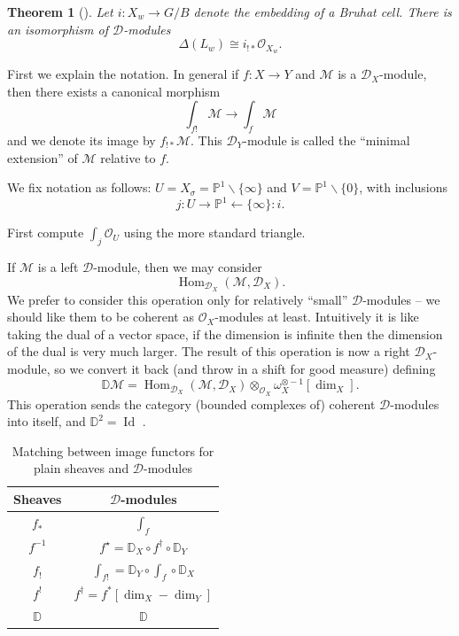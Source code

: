 \documentclass[12pt]{article}
\theoremstyle{plain}
\newtheorem{thm}{Theorem}[section]
\theoremstyle{definition}
\numberwithin{equation}{section}
\DeclareMathOperator{\Hom}{Hom}
\DeclareMathOperator{\Id}{Id}
\newcommand{\bbD}{\mathbb{D}}
\newcommand{\D}{\Delta}
\newcommand{\bbP}{\mathbb{P}}
\newcommand{\CD}{\mathcal{D}}
\newcommand{\OO}{\mathcal{O}}
\newcommand{\CM}{\mathcal{M}}
\begin{document}
\begin{thm}[{\cite[Proposition 12.3.2 (i)]{HTT}}]
Let $i : X_w \rightarrow G/B$ denote the embedding of a Bruhat cell. There is an isomorphism of $\CD$-modules
\[
\D(L_w) \cong i_{!*} \OO_{X_w}.
\]
\end{thm}
First we explain the notation. In general if $f : X \rightarrow Y$ and $\CM$ is a $\CD_X$-module, then there exists a canonical morphism
\[
\int_{f!} \CM \rightarrow \int_f \CM
\]
and we denote its image by $f_{!*} \CM$. This $\CD_Y$-module is called the ``minimal extension'' of $\CM$ relative to $f$.

We fix notation as follows: $U = X_\sigma = \bbP^1 \backslash \{\infty\}$ and $V = \bbP^1 \backslash \{0\}$, with inclusions
\[
j : U \rightarrow \bbP^1 \leftarrow \{\infty\} : i.
\]

{\color{blue}First compute $\int_j \OO_U$ using the more standard triangle.}


If $\CM$ is a left $\CD$-module, then we may consider
\[
\Hom_{\CD_X}(\CM, \CD_X).
\]
We prefer to consider this operation only for relatively ``small'' $\CD$-modules -- we should like them to be coherent as $\OO_X$-modules at least. Intuitively it is like taking the dual of a vector space, if the dimension is infinite then the dimension of the dual is very much larger. The result of this operation is now a right $\CD_X$-module, so we convert it back (and throw in a shift for good measure) defining
\[
\bbD\CM = \Hom_{\CD_X}(\CM, \CD_X) \otimes_{\OO_X} \omega_X^{\otimes -1} [\dim_X].
\]
This operation sends the category (bounded complexes of) coherent $\CD$-modules into itself, and $\bbD^2 = \Id$ {\cite[Proposition 2.6.5]{HTT}}.
\begin{table}[h!]
\centering
\begin{tabular}{ |c|c| }
\hline
Sheaves & $\CD$-modules \\
\hline
$f_*$ & $\int_f$ \\
$f^{-1}$ & $f^\star = \bbD_X \circ f^\dagger \circ \bbD_Y$ \\
$f_!$ & $\int_{f!} = \bbD_Y \circ \int_f \circ \bbD_X$ \\
$f^!$ & $f^\dagger = f^*[\dim_X-\dim_Y]$ \\
$\bbD$ & $\bbD$ \\
\hline
\end{tabular}
\caption{Matching between image functors for plain sheaves and $\CD$-modules}
\label{table:6-func}
\end{table}
\end{document}
